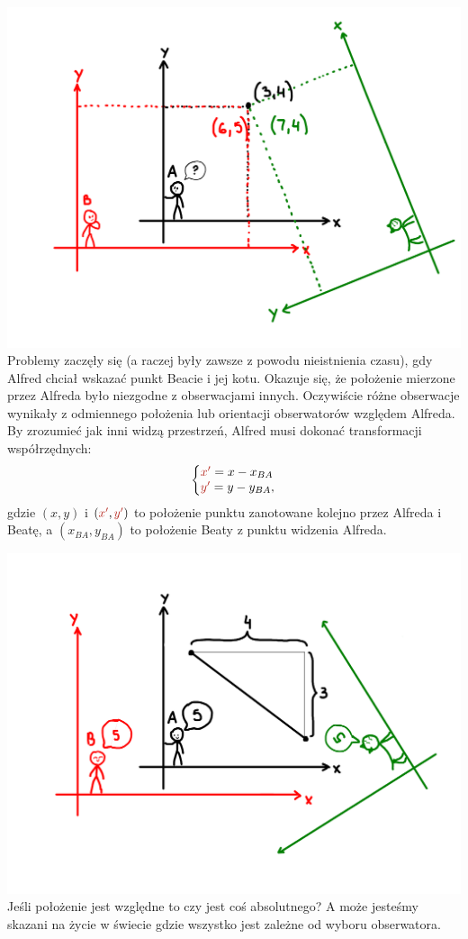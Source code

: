 \documentclass[10pt,twocolumn,fleqn,polish]{article}
\makeatletter
\providecommand{\mathcolor}[2]{{\color{#1}#2}}
\newenvironment{eqsystem}
  {\left\lbrace
    \begin{array}{@{}l@{}}}
  {\end{array}\right.}
\makeatother
\begin{document}
\noindent\includegraphics[width=1\linewidth]{pages/STA-page2}
Problemy zaczęły się (a raczej były zawsze z powodu nieistnienia czasu),
gdy Alfred chciał wskazać punkt Beacie i jej kotu.
Okazuje się, że położenie mierzone przez Alfreda było niezgodne z obserwacjami innych.
Oczywiście różne obserwacje wynikały z odmiennego położenia
lub orientacji obserwatorów względem Alfreda.
By zrozumieć jak inni widzą przestrzeń, Alfred musi dokonać transformacji
współrzędnych\footnotemark:
\[
  \begin{eqsystem}
    \mathcolor{BrickRed}{x'} = x - x_{BA} \\
    \mathcolor{BrickRed}{y'} = y - y_{BA},
  \end{eqsystem}
\]
gdzie $(x, y)$ i $(\mathcolor{BrickRed}{x'}, \mathcolor{BrickRed}{y'})$ to położenie
punktu zanotowane kolejno przez Alfreda i Beatę, a $(x_{BA}, y_{BA})$ to położenie
Beaty z punktu widzenia Alfreda.
\newpage

\noindent\includegraphics[width=1\linewidth]{pages/STA-page3}
Jeśli położenie jest względne to czy jest coś absolutnego? A może jesteśmy
skazani na życie w świecie gdzie wszystko jest zależne od wyboru obserwatora.
\end{document}

